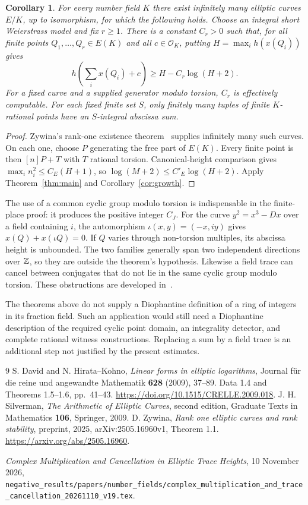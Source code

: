 \documentclass[11pt,a4paper]{article}
\newtheorem{corollary}[theorem]{Corollary}
\newcommand{\OK}{\mathcal O_K}
\begin{document}
\begin{corollary}\label{cor:rankonecurves}
For every number field $K$ there exist infinitely many elliptic
curves $E/K$, up to isomorphism, for which the following holds.
Choose an integral short Weierstrass model and fix $r\ge1$.
There is a constant $C_r>0$ such that, for all finite points
$Q_1,\ldots,Q_r\in E(K)$ and all $c\in\OK$, putting
$H=\max_i h(x(Q_i))$ gives
\[
 h\left(\sum_i x(Q_i)+c\right)\ge H-C_r\log(H+2).
\]
For a fixed curve and a supplied generator modulo torsion,
$C_r$ is effectively computable. For each fixed finite set $S$,
only finitely many tuples of finite $K$-rational points have an
$S$-integral abscissa sum.
\end{corollary}
\begin{proof}
Zywina's rank-one existence theorem~\cite[Theorem 1.1]{Zywina}
supplies infinitely many such curves. On each one, choose $P$
generating the free part of $E(K)$. Every finite point is then
$[n]P+T$ with $T$ rational torsion. Canonical-height comparison
gives $\max_i n_i^2\le C_E(H+1)$, so
$\log(M+2)\le C'_E\log(H+2)$. Apply
Theorem~\ref{thm:main} and Corollary~\ref{cor:growth}.
\end{proof}

The use of a common cyclic group modulo torsion is indispensable
in the finite-place proof: it produces the positive integer
$C_J$. For the curve $y^2=x^3-Dx$ over a field containing $i$,
the automorphism $\iota(x,y)=(-x,iy)$ gives
$x(Q)+x(\iota Q)=0$. If $Q$ varies through non-torsion multiples,
its abscissa height is unbounded. The two families generally
span two independent directions over $\mathbb Z$, so they are outside
the theorem's hypothesis. Likewise a field trace can cancel
between conjugates that do not lie in the same cyclic group
modulo torsion. These obstructions are developed in~\cite{CM}.

The theorems above do not supply a Diophantine definition of a
ring of integers in its fraction field. Such an application
would still need a Diophantine description of the required
cyclic point domain, an integrality detector, and complete
rational witness constructions. Replacing a sum by a field trace
is an additional step not justified by the present estimates.

\begin{thebibliography}{9}
S. David and N. Hirata--Kohno,
\emph{Linear forms in elliptic logarithms},
Journal f\"ur die reine und angewandte Mathematik \textbf{628}
(2009), 37--89. Data 1.4 and Theorems 1.5--1.6, pp.~41--43.
\url{https://doi.org/10.1515/CRELLE.2009.018}.
J. H. Silverman, \emph{The Arithmetic of Elliptic Curves},
second edition, Graduate Texts in Mathematics \textbf{106},
Springer, 2009.
D. Zywina, \emph{Rank one elliptic curves and rank stability},
preprint, 2025, arXiv:2505.16960v1, Theorem 1.1.
\url{https://arxiv.org/abs/2505.16960}.
\begingroup\raggedright
\emph{Complex Multiplication and Cancellation in Elliptic Trace Heights},
10 November 2026,
\nolinkurl{negative_results/papers/number_fields/complex_multiplication_and_trace_cancellation_20261110_v19.tex}.\par\endgroup
\end{thebibliography}
\end{document}
